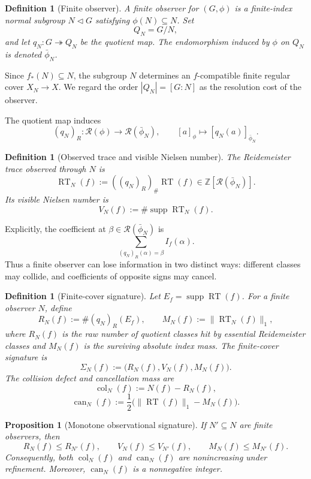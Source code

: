 \documentclass[11pt]{article}
\newtheorem{proposition}[theorem]{Proposition}
\newtheorem{definition}[theorem]{Definition}
\DeclareMathOperator{\supp}{supp}
\newcommand{\RT}{\operatorname{RT}}
\newcommand{\RN}{\mathcal R}
\newcommand{\Z}{\mathbb Z}
\begin{document}
\begin{definition}[Finite observer]
A finite observer for $(G,\phi)$ is a finite-index normal subgroup
$N\triangleleft G$ satisfying $\phi(N)\subseteq N$.  Set
\[
  Q_N=G/N,
\]
and let $q_N\colon G\twoheadrightarrow Q_N$ be the quotient map.  The
endomorphism induced by $\phi$ on $Q_N$ is denoted $\bar\phi_N$.
\end{definition}

Since $f_*(N)\subseteq N$, the subgroup $N$ determines an $f$-compatible finite regular
cover $X_N\to X$.  We regard the order $|Q_N|=[G:N]$ as the resolution cost of
the observer.

The quotient map induces
\[
  (q_N)_R\colon\RN(\phi)\longrightarrow\RN(\bar\phi_N),
  \qquad
  [a]_\phi\longmapsto[q_N(a)]_{\bar\phi_N}.
\]

\begin{definition}[Observed trace and visible Nielsen number]
The Reidemeister trace observed through $N$ is
\[
  \RT_N(f):=((q_N)_R)_\#\RT(f)
  \in\Z[\RN(\bar\phi_N)].
\]
Its visible Nielsen number is
\[
  V_N(f):=\#\supp\RT_N(f).
\]
\end{definition}

Explicitly, the coefficient at $\beta\in\RN(\bar\phi_N)$ is
\[
  \sum_{(q_N)_R(\alpha)=\beta} I_f(\alpha).
\]
Thus a finite observer can lose information in two distinct ways: different
classes may collide, and coefficients of opposite signs may cancel.

\begin{definition}[Finite-cover signature]
Let $E_f=\supp\RT(f)$.  For a finite observer $N$, define
\[
  R_N(f):=\#(q_N)_R(E_f),
  \qquad
  M_N(f):=\|\RT_N(f)\|_1,
\]
where $R_N(f)$ is the raw number of quotient classes hit by essential
Reidemeister classes and $M_N(f)$ is the surviving absolute index mass.  The
finite-cover signature is
\[
  \Sigma_N(f):=\bigl(R_N(f),V_N(f),M_N(f)\bigr).
\]
The collision defect and cancellation mass are
\[
  \operatorname{col}_N(f):=N(f)-R_N(f),
\]
\[
  \operatorname{can}_N(f)
  :=\frac12\bigl(\|\RT(f)\|_1-M_N(f)\bigr).
\]
\end{definition}

\begin{proposition}[Monotone observational signature]
\label{prop:signature}
If $N'\subseteq N$ are finite observers, then
\[
  R_N(f)\le R_{N'}(f),\qquad
  V_N(f)\le V_{N'}(f),\qquad
  M_N(f)\le M_{N'}(f).
\]
Consequently, both $\operatorname{col}_N(f)$ and
$\operatorname{can}_N(f)$ are nonincreasing under refinement.  Moreover,
$\operatorname{can}_N(f)$ is a nonnegative integer.
\end{proposition}
\end{document}
